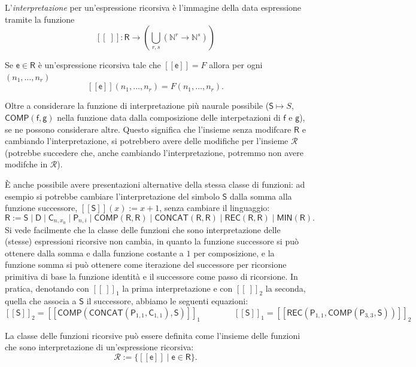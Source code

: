 \begin{defi}
L'\textit{interpretazione} per un'espressione ricorsiva
è l'immagine della data espressione tramite la funzione
\[
[[\;]]\colon \mathsf R\to\left(\bigcup_{r,s}\left(\mathbb N^r\to\mathbb N^s\right)\right)
\]
\end{defi}


\begin{exam}
Se $\mathsf e\in\mathsf R$ è un'espressione ricorsiva tale che $[[\mathsf e]]=F$ allora per ogni $(n_1,\dots,n_r)$
\[
[[\mathsf e]](n_1,\dots,n_r)=F(n_1,\dots,n_r).
\]
\end{exam}
Oltre a considerare la funzione di interpretazione più naurale possibile 
($\mathsf{S} \mapsto S$, $\mathsf{COMP}(\mathsf f, \mathsf g)$
 nella funzione data dalla composizione delle interpetazioni di 
 $\mathsf f$ e $\mathsf g$),
 se ne possono considerare altre.
Questo significa che l'insieme senza modifcare $\mathsf R$ 
e cambiando l'interpretazione, si potrebbero avere delle modifiche
per l'insieme $\mathcal R$ (potrebbe succedere che, 
anche cambiando l'interpretazione, potremmo non avere modifche in $\mathcal R$).
\begin{rema}
È anche possibile avere presentazioni alternative della stessa classe di funzioni: ad esempio si potrebbe cambiare l'interpretazione del simbolo $\mathsf S$ dalla somma alla funzione successore, $[[\mathsf S]](x):=x+1$, senza cambiare il linguaggio:
\[
\mathsf R:=\mathsf S\mid\mathsf D\mid\mathsf C_{n,x_0}\mid\mathsf P_{n,i}\mid\mathsf{COMP}(\mathsf R,\mathsf R)\mid\mathsf{CONCAT}(\mathsf R,\mathsf R)\mid\mathsf{REC}(\mathsf R,\mathsf R)\mid\mathsf{MIN}(\mathsf R).
\]
Si vede facilmente che la classe delle funzioni che sono interpretazione delle (stesse) espressioni ricorsive non cambia, in quanto la funzione successore si può ottenere dalla somma e dalla funzione costante a $1$ per composizione, e la funzione somma si può ottenere come iterazione del successore per ricorsione primitiva di base la funzione identità e il successore come passo di ricorsione. In pratica, denotando con $[[\ ]]_1$ la prima interpretazione e con $[[\ ]]_2$ la seconda, quella che associa a $\mathsf S$ il successore, abbiamo le seguenti equazioni:
\[
[[\mathsf S]]_2=[[\mathsf{COMP}(\mathsf{CONCAT}(\mathsf P_{1,1},\mathsf C_{1,1}),\mathsf S)]]_1
\qquad\qquad
[[\mathsf S]]_1=[[\mathsf{REC}(\mathsf P_{1,1},\mathsf{COMP}(\mathsf P_{3,3},\mathsf S))]]_2
\]
\end{rema}
\begin{rema}
La classe delle funzioni ricorsive può essere definita come l'insieme delle funzioni che sono interpretazione di un'espressione ricorsiva:
\[
\mathcal R:=\{[[\mathsf e]]\mid \mathsf e\in\mathsf R\}.
\]
\end{rema}


